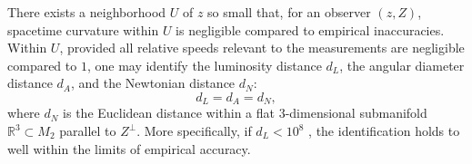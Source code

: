 There exists a neighborhood $U$ of $z$ so small that, for an observer $(z, Z)$, spacetime curvature within $U$ is negligible compared to empirical inaccuracies. Within $U$, provided all relative speeds relevant to the measurements are negligible compared to $1$, one may identify the luminosity distance $d_L$, the angular diameter distance $d_A$, and the Newtonian distance $d_N$:
$$d_L = d_A = d_N,$$
where $d_N$ is the Euclidean distance within a flat $3$-dimensional submanifold $\mathbb{R}^3 \subset M_2$ parallel to $Z^\perp$. More specifically, if $d_L < 10^8$ , the identification holds to well within the limits of empirical accuracy.
